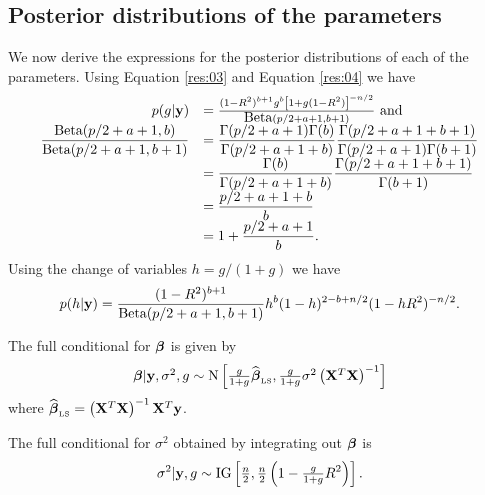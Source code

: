 \subsection{Posterior distributions of the parameters}
We now derive the expressions for the posterior distributions of each of the parameters. Using Equation
\ref{res:03} and Equation \ref{res:04} we have
\begin{equation}
\begin{array}{rl}\label{res:06}
	p(g|{\bf y}) & = \frac{(1 -  R^2)^{b+1} g^{b} \left[  1 + g(1 -  R^2) \right]^{-n/2}}{\mbox{Beta}(p/2 + a + 1,b+1)} \text{ and } \\
	\displaystyle \frac{\mbox{Beta}(p/2 + a + 1,b)}{\mbox{Beta}(p/2 + a + 1,b+1)}
	  & \displaystyle = \frac{\Gamma(p/2 + a + 1)\Gamma(b)}{\Gamma(p/2 + a + 1 + b)} 
	\frac{\Gamma(p/2 + a + 1 + b + 1)}{\Gamma(p/2 + a + 1)\Gamma(b+1)}
	\\
	  & \displaystyle = \frac{\Gamma(b)}{\Gamma(p/2 + a + 1 + b)}                    
	\frac{\Gamma(p/2 + a + 1 + b + 1)}{\Gamma(b+1)}
	\\
	  & \displaystyle = \frac{p/2 + a + 1 + b}{b}                                    
	\\
	  & \displaystyle = 1 + \frac{p/2 + a + 1}{b}.                                   
\end{array}
\end{equation}
\noindent Using the change of variables $h=g/(1+g)$ we have
\begin{equation}
	p(h|{\bf y}) = \frac{(1 -  R^2)^{b+1}}{\mbox{Beta}(p/2 + a + 1,b+1)} h^{b}(1 - h)^{2-b+n/2}  (1  - h R^2)^{-n/2}.
\end{equation}
 

\noindent The full conditional for ${\boldsymbol \beta}$ is given by
\begin{equation}
	\begin{array}{rl}
		{\boldsymbol\beta}|{\bf y},\sigma^2,g \sim \text{N}\left[                  
		\tfrac{g}{1+g}\widehat{{\boldsymbol \beta}}_{\mbox{\tiny LS}},    
		\tfrac{g}{1+g} \sigma^2 \left( {\bf X}^T{\bf X} \right)^{-1} 
		\right]                                              
	\end{array} 
\end{equation}
\noindent where $\widehat{{\boldsymbol \beta}}_{\mbox{\tiny LS}} = \left( {\bf X}^T{\bf X} \right)^{-1}{\bf X}^T{\bf y}$.

The full conditional for $\sigma^2$ obtained by integrating out ${\boldsymbol \beta}$ is
\begin{equation}
	\sigma^2|{\bf y},g \sim \mbox{IG}\left[\tfrac{n}{2},\tfrac{n}{2}\left( 
		1 -
	\tfrac{g}{1+g} R^2\right) \right].
\end{equation}

